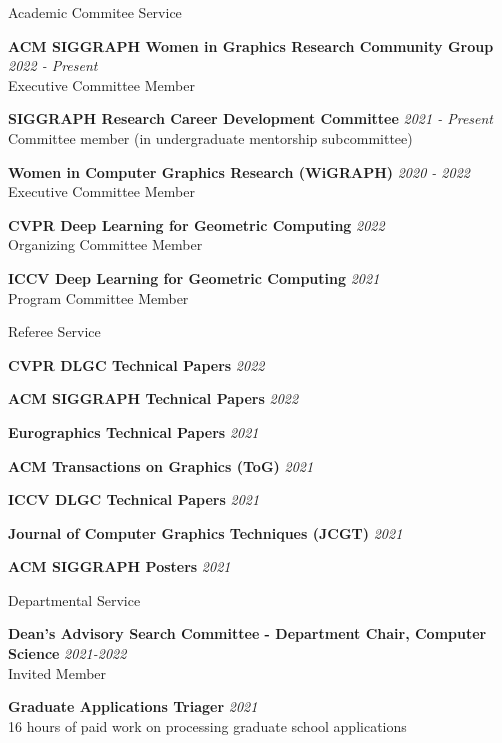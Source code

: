 \documentclass{resume}
\newcommand{\cvitem}[3]{
    {\bf #1} \hfill {\em \small #2} \\ 
    {\small#3 }
}
\newcommand{\cvitemtiny}[2]{
    {\bf #1} \hfill {\em \small #2}
}
\begin{document}
\begin{rSection}{Academic Commitee Service}

\cvitem{ACM SIGGRAPH Women in Graphics Research Community Group}{2022 - Present}{Executive Committee Member}

\cvitem{SIGGRAPH Research Career Development Committee}{2021 - Present}{Committee member (in undergraduate mentorship subcommittee)}

\cvitem{Women in Computer Graphics Research (WiGRAPH)}{2020 - 2022}{Executive Committee Member}

\cvitem{CVPR Deep Learning for Geometric Computing}{2022}{Organizing Committee Member}

\cvitem{ICCV Deep Learning for Geometric Computing}{2021}{Program Committee Member}

\end{rSection}

\begin{rSection}{Referee Service}

\cvitemtiny{CVPR DLGC Technical Papers}{2022}

\cvitemtiny{ACM SIGGRAPH Technical Papers}{2022}

\cvitemtiny{Eurographics Technical Papers}{2021}

\cvitemtiny{ACM Transactions on Graphics (ToG)}{2021}

\cvitemtiny{ICCV DLGC Technical Papers}{2021}

\cvitemtiny{Journal of Computer Graphics Techniques (JCGT)}{2021}

\cvitemtiny{ACM SIGGRAPH Posters}{2021}

\end{rSection}

\begin{rSection}{Departmental Service}

\cvitem{Dean's Advisory Search Committee -  Department Chair, Computer Science}{2021-2022}{Invited Member}

\cvitem{Graduate Applications Triager}{2021}{16 hours of paid work on processing graduate school applications}



\end{rSection}
\end{document}
